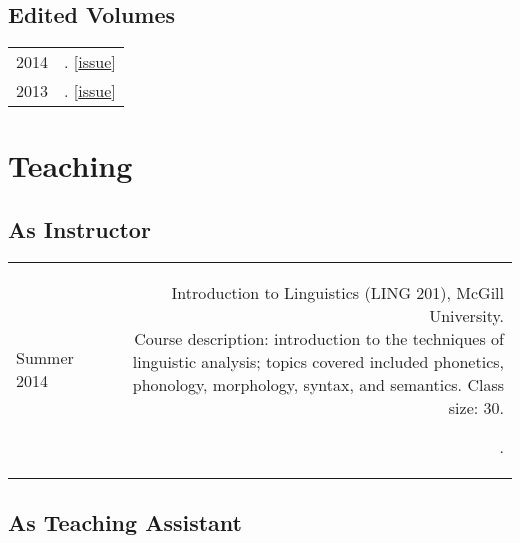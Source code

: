 \documentclass[11pt,letterpaper,twoside]{article}
\makeatletter
\newcommand{\bodywidth}{0.75}
\newcommand{\myvrule}{\color{lightgray}\vrule width 1.0pt}
\newenvironment{cvsection}{%
  \renewcommand{\arraystretch}{1.75}
  \begin{longtable}[l]{@{} L R @{}}
}{%
  \end{longtable}
}
\newcommand{\course}[3]{%
  \parbox[t]{\bodywidth\textwidth}{#1. \\ {\footnotesize Course description:
      #2. Class size: #3.}}
}
\makeatother
\begin{document}
\subsection*{Edited Volumes}

\begin{cvsection}
  2014 & \null{}.
  [\href{https://www.mcgill.ca/mcgwpl/archives/volume-241-2014}{issue}] \\
  2013 & \null{}.
  [\href{https://www.mcgill.ca/mcgwpl/archives/volume-231-2013}{issue}]
\end{cvsection}

\section*{Teaching}

\subsection*{As Instructor}

\begin{cvsection}
  {\small Summer} 2014 & \course{Introduction to Linguistics (LING 201), McGill
    University}{introduction to the techniques of linguistic analysis; topics
    covered included phonetics, phonology, morphology, syntax, and
    semantics}{30}.
\end{cvsection}

\subsection*{As Teaching Assistant}
\end{document}
